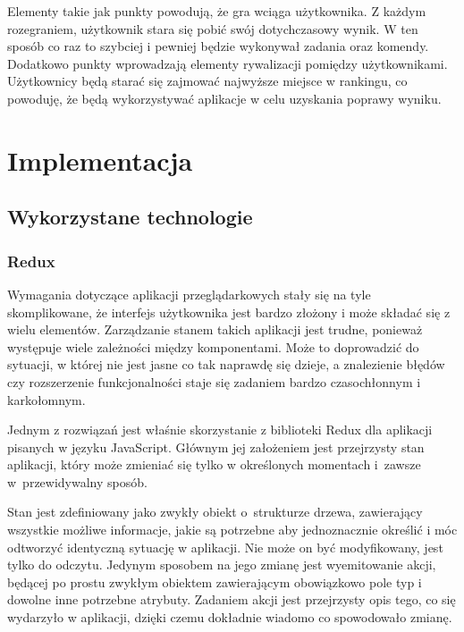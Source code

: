\documentclass[11pt,a4paper,polish,thesis]{dcsbook}
\begin{document}

	Elementy takie jak punkty powodują, że gra wciąga użytkownika. Z każdym rozegraniem, użytkownik stara się pobić swój dotychczasowy wynik. W ten sposób co raz to szybciej i pewniej będzie wykonywał zadania oraz komendy. Dodatkowo punkty wprowadzają elementy rywalizacji pomiędzy użytkownikami. Użytkownicy będą starać się zajmować najwyższe miejsce w rankingu, co powoduję, że będą wykorzystywać aplikacje w celu uzyskania poprawy wyniku. 

	
	
	\chapter{Implementacja}
	
	\section{Wykorzystane technologie}
	
	\subsection{Redux}
	
	Wymagania dotyczące aplikacji przeglądarkowych stały się na tyle skomplikowane, że interfejs użytkownika jest bardzo złożony i może składać się z wielu elementów.
	Zarządzanie stanem takich aplikacji jest trudne, ponieważ występuje wiele zależności między komponentami. Może to doprowadzić do sytuacji, w której nie jest jasne co tak naprawdę się dzieje, a znalezienie błędów czy rozszerzenie funkcjonalności staje się zadaniem bardzo czasochłonnym i karkołomnym. 
	
	Jednym z rozwiązań jest właśnie skorzystanie z biblioteki Redux dla aplikacji pisanych w języku JavaScript. Głównym jej założeniem jest przejrzysty stan aplikacji, który może zmieniać się tylko w określonych momentach i~zawsze w~przewidywalny sposób. 
	
	Stan jest zdefiniowany jako zwykły obiekt o~strukturze drzewa, zawierający wszystkie możliwe informacje, jakie są potrzebne aby jednoznacznie określić i móc odtworzyć identyczną sytuację w aplikacji. Nie może on być modyfikowany, jest tylko do odczytu. Jedynym sposobem na jego zmianę jest wyemitowanie akcji, będącej po prostu zwykłym obiektem zawierającym obowiązkowo pole typ i dowolne inne potrzebne atrybuty.	Zadaniem akcji jest przejrzysty opis tego, co się wydarzyło w aplikacji, dzięki czemu dokładnie wiadomo co spowodowało zmianę. 
	
\end{document}
